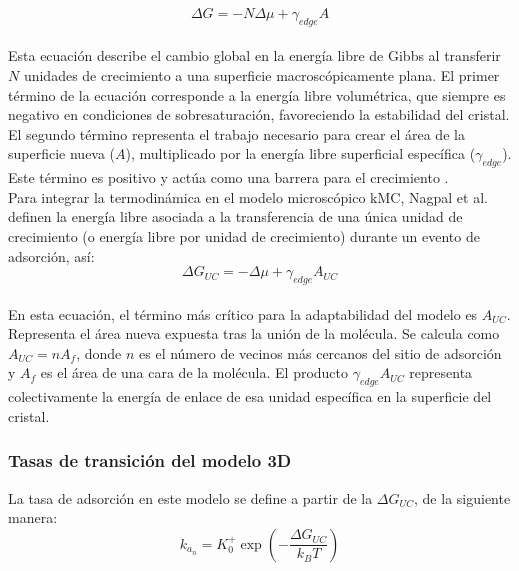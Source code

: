 \documentclass[12pt,letterpaper,oneside]{report}
\begin{document}
\begin{equation}
   \Delta G = -N \Delta\mu + \gamma_{edge}A
   \label{eq:gibbs_1}
\end{equation}\\

Esta ecuación describe el cambio global en la energía libre de Gibbs al transferir $N$ unidades de crecimiento a una superficie macroscópicamente plana. El primer término de la ecuación corresponde a la energía libre volumétrica, que siempre es negativo en condiciones de sobresaturación, favoreciendo la estabilidad del cristal. El segundo término representa el trabajo necesario para crear el área de la superficie nueva ($A$), multiplicado por la energía libre superficial específica ($\gamma_{edge}$). Este término es positivo y actúa como una barrera para el crecimiento \cite{Nagpal2024}.\\

Para integrar la termodinámica en el modelo microscópico kMC, Nagpal et al. definen la energía libre asociada a la transferencia de una única unidad de crecimiento (o energía libre por unidad de crecimiento) durante un evento de adsorción, así:\\

\begin{equation}
    \Delta G_{UC} = -\Delta\mu + \gamma_{edge}A_{UC}
    \label{eq:gibbs_2}
\end{equation}\\

En esta ecuación, el término más crítico para la adaptabilidad del modelo es $A_{UC}$. Representa el área nueva expuesta tras la unión de la molécula. Se calcula como $A_{UC} = nA_f$, donde $n$ es el número de vecinos más cercanos del sitio de adsorción y $A_f$ es el área de una cara de la molécula. El producto $\gamma_{edge}A_{UC}$ representa colectivamente la energía de enlace de esa unidad específica en la superficie del cristal.\\

\subsubsection{Tasas de transición del modelo 3D}

La tasa de adsorción en este modelo se define a partir de la $\Delta G_{UC}$, de la siguiente manera:\\

\begin{equation*}
    k_{a_n} = K_0^+\exp{\left(-\frac{\Delta G_{UC}}{k_BT}\right)}
\end{equation*}\\
\end{document}
